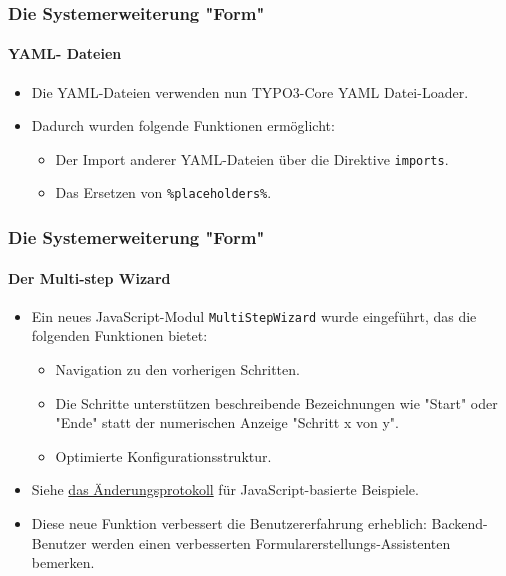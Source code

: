 
\begin{frame}[fragile]
	\frametitle{Die Systemerweiterung "Form"}
	\framesubtitle{YAML- Dateien}

	\begin{itemize}
		\item Die YAML-Dateien verwenden nun TYPO3-Core YAML Datei-Loader.
		\item Dadurch wurden folgende Funktionen ermöglicht:

			\begin{itemize}
				\item Der Import anderer YAML-Dateien über die Direktive \texttt{imports}.
				\item Das Ersetzen von \texttt{\%placeholders\%}.
			\end{itemize}

	\end{itemize}

\end{frame}


\begin{frame}[fragile]
	\frametitle{Die Systemerweiterung "Form"}
	\framesubtitle{Der Multi-step Wizard}

	\begin{itemize}
		\item Ein neues JavaScript-Modul \texttt{MultiStepWizard} wurde eingeführt, das die folgenden Funktionen bietet:

			\begin{itemize}
				\item Navigation zu den vorherigen Schritten.
				\item Die Schritte unterstützen beschreibende Bezeichnungen wie "Start" oder "Ende" statt der numerischen Anzeige "Schritt x von y".
				\item Optimierte Konfigurationsstruktur.
			\end{itemize}

		\item Siehe \href{https://docs.typo3.org/c/typo3/cms-core/master/en-us/Changelog/10.2/Feature-79445-AddMultistepWizard.html}{das Änderungsprotokoll}
			für JavaScript-basierte Beispiele.

		\item Diese neue Funktion verbessert die Benutzererfahrung erheblich: Backend-Benutzer werden einen verbesserten Formularerstellungs-Assistenten bemerken.

	\end{itemize}

\end{frame}

